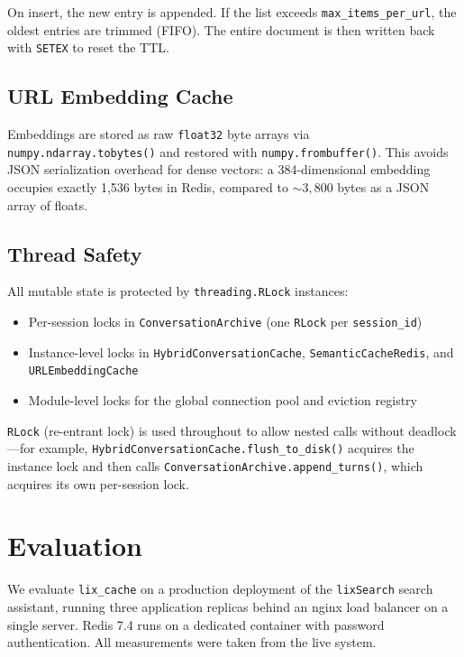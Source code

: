 \documentclass[conference]{IEEEtran}
\begin{document}
On insert, the new entry is appended. If the list exceeds \texttt{max\_items\_per\_url}, the oldest entries are trimmed (FIFO). The entire document is then written back with \texttt{SETEX} to reset the TTL.

\subsection{URL Embedding Cache}

Embeddings are stored as raw \texttt{float32} byte arrays via \texttt{numpy.ndarray.tobytes()} and restored with \texttt{numpy.frombuffer()}. This avoids JSON serialization overhead for dense vectors: a 384-dimensional embedding occupies exactly 1,536 bytes in Redis, compared to ${\sim}3{,}800$ bytes as a JSON array of floats.

\subsection{Thread Safety}

All mutable state is protected by \texttt{threading.RLock} instances:
\begin{itemize}
\item Per-session locks in \texttt{ConversationArchive} (one \texttt{RLock} per \texttt{session\_id})
\item Instance-level locks in \texttt{HybridConversationCache}, \texttt{SemanticCacheRedis}, and \texttt{URLEmbeddingCache}
\item Module-level locks for the global connection pool and eviction registry
\end{itemize}

\texttt{RLock} (re-entrant lock) is used throughout to allow nested calls without deadlock---for example, \texttt{HybridConversationCache.flush\_to\_disk()} acquires the instance lock and then calls \texttt{ConversationArchive.append\_turns()}, which acquires its own per-session lock.

\section{Evaluation}
\label{sec:evaluation}

We evaluate \texttt{lix\_cache} on a production deployment of the \texttt{lixSearch} search assistant, running three application replicas behind an nginx load balancer on a single server. Redis 7.4 runs on a dedicated container with password authentication. All measurements were taken from the live system.
\end{document}
